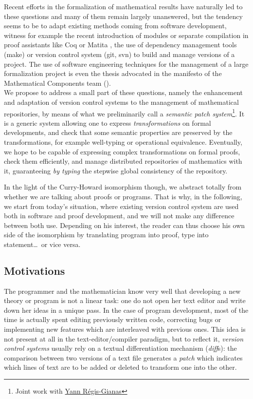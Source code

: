 \documentclass[twoside,a4paper,12pt]{article}
\newcommand{\Coq}{\textsf{Coq} }
\newcommand{\Matita}{\textsf{Matita} }
\begin{document}
Recent efforts in the formalization of mathematical results have
naturally led to these questions and many of them remain largely
unanswered, but the tendency seems to be to adapt existing methods
coming from software development, witness for example the recent
introduction of modules or separate compilation in proof assistants
like \Coq or \Matita, the use of dependency management tools
(\textsf{make}) or version control system (\textsf{git}, \textsf{svn})
to build and manage versions of a project. The use of software
engineering techniques for the management of a large formalization
project is even the thesis advocated in the manifesto of the
Mathematical Components team (\cite{gonthiermanifesto}).
\\[-0.5em]

We propose to address a small part of these questions, namely the
enhancement and adaptation of version control systems to the
management of mathematical repositories, by means of what we
preliminarily call a \emph{semantic patch system}\footnote{Joint work
  with \href{http://www.pps.jussieu.fr/~yrg/}{Yann R\'egis-Gianas}}.
It is a generic system allowing one to express \emph{transformations}
on formal developments, and check that some semantic properties are
preserved by the transformations, for example well-typing or
operational equivalence. Eventually, we hope to be capable of
expressing complex transformations on formal proofs, check them
efficiently, and manage distributed repositories of mathematics with
it, guaranteeing \emph{by typing} the stepwise global consistency of
the repository.

In the light of the Curry-Howard isomorphism though, we abstract
totally from whether we are talking about proofs or programs. That is
why, in the following, we start from today's situation, where existing
version control system are used both in software and proof
development, and we will not make any difference between both
use. Depending on his interest, the reader can thus choose his own
side of the isomorphism by translating program into proof, type into
statement\ldots\ or vice versa.

\subsection{Motivations}

The programmer and the mathematician know very well that developing a
new theory or program is not a linear task: one do not open her text
editor and write down her ideas in a unique pass. In the case of
program development, most of the time is actually spent editing
previously written code, correcting bugs or implementing new features
which are interleaved with previous ones. This idea is not present at
all in the text-editor/compiler paradigm, but to reflect it,
\emph{version control systems} usually rely on a textual
differentiation mechanism (\emph{diff}s): the comparison between two
versions of a text file generates a \emph{patch} which indicates which
lines of text are to be added or deleted to transform one into the
other.
\end{document}
